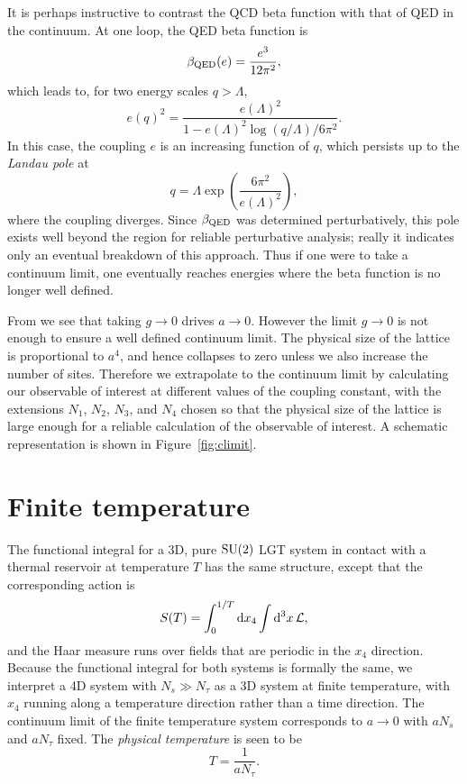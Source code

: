 It is perhaps instructive to contrast the QCD beta function with that of QED
in the continuum. At one loop, the QED beta function is
\begin{equation}
\beta_{\rm QED}(e)=\frac{e^3}{12\pi^2},
\end{equation}
which leads to, for two energy scales $q>\Lambda$,
\begin{equation}\label{eq:QEDbeta}
e(q)^2=\frac{e(\Lambda)^2}{1-e(\Lambda)^2
\log\left(q/\Lambda\right)/6\pi^2}.
\end{equation}
In this case, the coupling $e$ is an increasing function of $q$, which persists
up to the {\it Landau pole} at
\begin{equation}
q=\Lambda\exp\left(\frac{6\pi^2}{e(\Lambda)^2}\right),
\end{equation}
where the coupling diverges. Since $\beta_{\rm QED}$ was determined
perturbatively, this pole exists well beyond the region for reliable
perturbative analysis; really it indicates only an eventual breakdown of this
approach. Thus if one were to take a continuum limit, one eventually reaches
energies where the beta function is no longer well defined.

From  we see that taking $g\to0$ drives $a\to0$.
However the limit $g\to0$ is not enough to ensure a well defined continuum
limit. The physical size of the lattice is proportional to $a^4$, and hence
collapses to zero unless we also increase the number of sites. Therefore
we extrapolate to the continuum limit by calculating our observable
of interest at different values of the coupling constant, with the 
extensions $N_1$, $N_2$, $N_3$, and $N_4$ chosen so that the physical 
size of the lattice is large enough for a reliable calculation of 
the observable of interest. A schematic representation is shown in
Figure~\ref{fig:climit}. 

\section{Finite temperature}\label{sec:finitetemp}

The functional integral for a 3D, 
pure $\operatorname{SU}(2)$ LGT system in contact with a thermal reservoir at 
temperature $T$ has the same structure, except that the corresponding 
action is
\begin{equation}\label{eq:Tintegral}
  S(T)=\int_0^{1/T}\dd{x_4}\int\dd[3]{x}\mathcal{L},
\end{equation}
and the Haar measure runs over fields that are periodic in the
$x_4$ direction. Because the functional integral for both systems is
formally the same, we interpret a 4D system with $N_s\gg N_\tau$ as
a 3D system at finite temperature, with $x_4$ running along a 
temperature direction rather than a time direction.
The continuum limit of the finite temperature system corresponds
to $a\to0$ with $aN_s$ and $aN_\tau$ fixed. The {\it physical
temperature} is seen to be
\begin{equation}\label{eq:latticeTemp}
  T=\frac{1}{aN_\tau}.
\end{equation}

